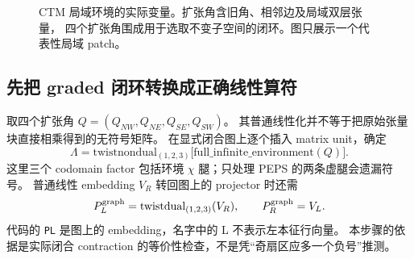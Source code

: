 \documentclass[11pt]{article}
\newcommand{\code}[1]{{\small\texttt{#1}}}
\begin{document}
\begin{figure}[htbp]\centering
{}
\caption{CTM 局域环境的实际变量。扩张角含旧角、相邻边及局域双层张量，
四个扩张角围成用于选取不变子空间的闭环。图只展示一个代表性局域 patch。}
\end{figure}

\subsection{先把 graded 闭环转换成正确线性算符}
取四个扩张角 $Q=(Q_{NW},Q_{NE},Q_{SE},Q_{SW})$。
其普通线性化并不等于把原始张量块直接相乘得到的无符号矩阵。
 在显式闭合图上逐个插入 matrix unit，确定
\begin{equation}
 \Lambda=\mathrm{twistnondual}_{(1,2,3)}
 \bigl[\mathrm{full\_infinite\_environment}(Q)\bigr].
 \label{eq:cycle}
\end{equation}
这里三个 codomain factor 包括环境 $\chi$ 腿；只处理 PEPS 的两条虚腿会遗漏符号。
普通线性 embedding $V_R$ 转回图上的 projector 时还需
\begin{equation}
 P_L^{\rm graph}=\mathrm{twistdual}_{(1,2,3)}(V_R),\qquad
 P_R^{\rm graph}=V_L.
\end{equation}
代码的 \code{PL} 是图上的 embedding，名字中的 L 不表示左本征行向量。
本步骤的依据是实际闭合 contraction 的等价性检查，不是凭“奇扇区应多一个负号”推测。
\end{document}

